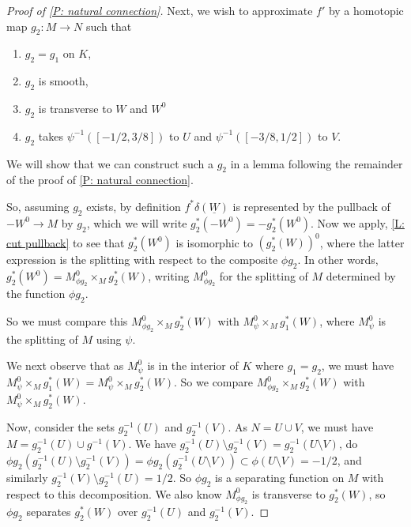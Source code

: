 \documentclass[12pt]{article}
\newcommand{\uW}{\underline{W}}
\theoremstyle{plain}
\theoremstyle{definition}
\theoremstyle{remark}
\begin{document}
\begin{proof}[Proof of \cref{P: natural connection}]
	Next, we wish to approximate $f'$ by a homotopic map $g_2 \colon M \to N$ such that
	\begin{enumerate}
		\item $g_2 = g_1$ on $K$,
		\item $g_2$ is smooth,
		\item $g_2$ is transverse to $W$ and $W^0$
		\item $g_2$ takes $\psi^{-1}([-1/2,3/8])$ to $U$ and $\psi^{-1}([-3/8,1/2])$ to $V$.
	\end{enumerate}
	We will show that we can construct such a $g_2$ in a lemma following the remainder of the proof of \cref{P: natural connection}.

	So, assuming $g_2$ exists, by definition $f^* \delta (\uW)$ is represented by the pullback of $-W^0 \to M$ by $g_2$, which we will write $g_2^*(-W^0) = - g_2^*(W^0)$.
	Now we apply, \cref{L: cut pullback} to see that $g_2^*(W^0)$ is isomorphic to $(g_2^*(W))^0$, where the latter expression is the splitting with respect to the composite $\phi g_2$.
	In other words, $g_2^*(W^0) = M^0_{\phi g_2} \times_M g_2^*(W)$, writing $M^0_{\phi g_2}$ for the splitting of $M$ determined by the function $\phi g_2$.

	So we must compare this $M^0_{\phi g_2} \times_M g_2^*(W)$ with $M^0_\psi \times_M g_1^*(W)$, where $M^0_\psi$ is the splitting of $M$ using $\psi$.

	We next observe that as $M^0_\psi$ is in the interior of $K$ where $g_1 = g_2$, we must have $M^0_\psi \times_M g_1^*(W) = M^0_\psi \times_M g_2^*(W)$.
	So we compare $M^0_{\phi g_2} \times_M g_2^*(W)$ with $M^0_\psi \times_M g_2^*(W)$.

	Now, consider the sets $g_2^{-1}(U)$ and $g_2^{-1}(V)$. As $N = U \cup V$, we must have $M = g_2^{-1}(U) \cup g^{-1}(V)$.
	We have $g_2^{-1}(U)\setminus g_2^{-1}(V) = g_2^{-1}(U \setminus V)$, do $\phi g_2(g_2^{-1}(U)\setminus g_2^{-1}(V)) = \phi g_2(g_2^{-1}(U \setminus V)) \subset \phi(U \setminus V) =   -1/2$, and similarly  $g_2^{-1}(V)\setminus g_2^{-1}(U) = 1/2$.
	So $\phi g_2$ is a separating function on $M$ with respect to this decomposition.
	We also know $M^0_{\phi g_2}$ is transverse to $g_2^*(W)$, so $\phi g_2$ separates $g_2^*(W)$ over $g_2^{-1}(U)$ and $g_2^{-1}(V)$.


\end{proof}
\end{document}
